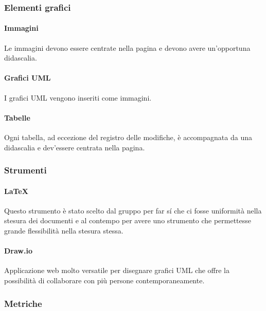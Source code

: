 \subsubsection{Elementi grafici}
\label{ssub:elementi_grafici}

\paragraph{Immagini}
\label{par:immagini}

Le immagini devono essere centrate nella pagina e devono avere un'opportuna didascalia.

\paragraph{Grafici UML}
\label{par:uml}

I grafici UML vengono inseriti come immagini.

\paragraph{Tabelle}
\label{par:tabelle}

Ogni tabella, ad eccezione del registro delle modifiche, è accompagnata da una didascalia e dev'essere centrata nella 
pagina.

\subsubsection{Strumenti}
\label{ssub:strumenti}

\paragraph{\LaTeX}
\label{par:latex}

Questo strumento è stato scelto dal gruppo per far sí che ci fosse uniformità nella stesura dei documenti e al contempo 
per avere uno strumento che permettesse grande flessibilità nella stesura stessa.

\paragraph{Draw.io}
\label{par:drawio}

Applicazione web molto versatile per disegnare grafici UML che offre la possibilità di collaborare con più persone 
contemporaneamente.

\subsubsection{Metriche}
\label{ssub:metriche}

